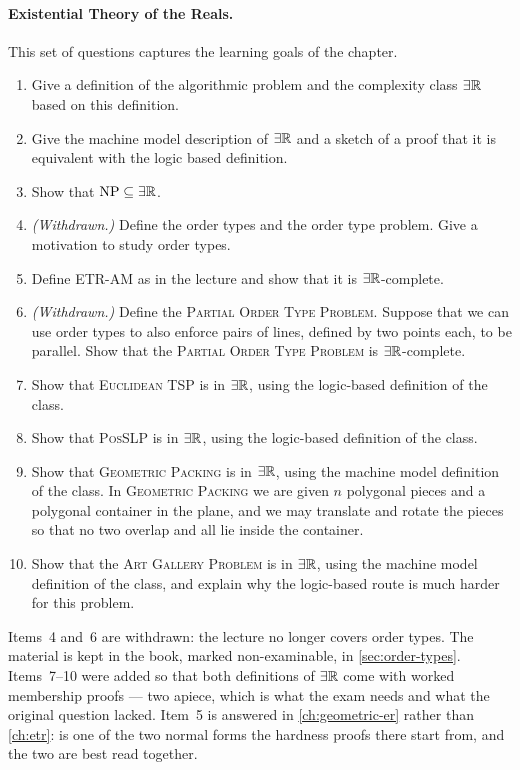 \paragraph{Existential Theory of the Reals.}
This set of questions captures the learning goals of the chapter.
\begin{enumerate}
  \item Give a definition of the algorithmic problem \ETR{} and the complexity
        class $\exists\mathbb{R}$ based on this definition.
  \item Give the machine model description of $\exists\mathbb{R}$ and a sketch of a proof that
        it is equivalent with the logic based definition.
  \item Show that $\mathrm{NP} \subseteq \exists\mathbb{R}$.
  \item \emph{(Withdrawn.)} Define the order types and the order type problem.
        Give a motivation to study order types.
  \item Define \textsc{ETR-AM} as in the lecture and show that it is
        $\exists\mathbb{R}$-complete.
  \item \emph{(Withdrawn.)} Define the \textsc{Partial Order Type Problem}.
        Suppose that we can use order types to also enforce pairs of lines,
        defined by two points each, to be parallel. Show that the
        \textsc{Partial Order Type Problem} is $\exists\mathbb{R}$-complete.
  \item Show that \textsc{Euclidean TSP} is in $\exists\mathbb{R}$, using the logic-based
        definition of the class.
  \item Show that \textsc{PosSLP} is in $\exists\mathbb{R}$, using the logic-based definition
        of the class.
  \item Show that \textsc{Geometric Packing} is in $\exists\mathbb{R}$, using the machine
        model definition of the class. In \textsc{Geometric Packing} we are
        given $n$ polygonal pieces and a polygonal container in the plane, and
        we may translate and rotate the pieces so that no two overlap and all
        lie inside the container.
  \item Show that the \textsc{Art Gallery Problem} is in $\exists\mathbb{R}$, using the
        machine model definition of the class, and explain why the logic-based
        route is much harder for this problem.
\end{enumerate}

\begin{remark}
Items~4 and~6 are withdrawn: the lecture no longer covers order types. The
material is kept in the book, marked non-examinable, in
\cref{sec:order-types}. Items~7--10 were added so that both definitions of
$\exists\mathbb{R}$ come with worked membership proofs --- two apiece, which is what the
exam needs and what the original question lacked. Item~5 is answered in
\cref{ch:geometric-er} rather than \cref{ch:etr}:  is one of the
two normal forms the hardness proofs there start from, and the two are best
read together.
\end{remark}


